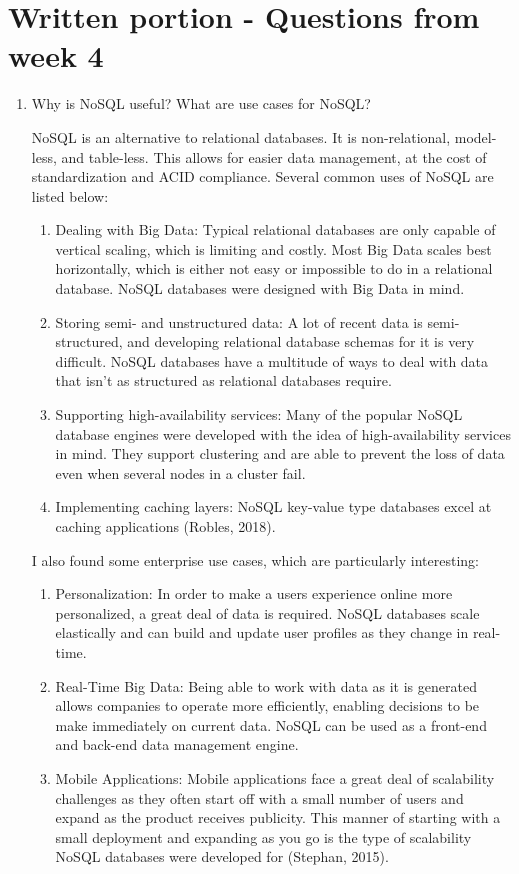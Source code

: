 \documentclass[]{article}
\begin{document}
\section{Written portion - Questions from week 4}
\begin{enumerate}
	
	\item Why is NoSQL useful? What are use cases for NoSQL?
	
	NoSQL is an alternative to relational databases.  It is non-relational, model-less, and table-less.  This allows for easier data management, at the cost of standardization and ACID compliance.  Several common uses of NoSQL are listed below:
	
	\begin{enumerate}
		\item Dealing with Big Data: Typical relational databases are only capable of vertical scaling, which is limiting and costly.  Most Big Data scales best horizontally, which is either not easy or impossible to do in a relational database.  NoSQL databases were designed with Big Data in mind.
		\item Storing semi- and unstructured data: A lot of recent data is semi-structured, and developing relational database schemas for it is very difficult.  NoSQL databases have a multitude of ways to deal with data that isn't as structured as relational databases require.
		\item Supporting high-availability services: Many of the popular NoSQL database engines were developed with the idea of high-availability services in mind.  They support clustering and are able to prevent the loss of data even when several nodes in a cluster fail.
		\item Implementing caching layers:  NoSQL key-value type databases excel at caching applications (Robles, 2018).
	\end{enumerate}
		I also found some enterprise use cases, which are particularly interesting:
	\begin{enumerate}
		\item Personalization:  In order to make a users experience online more personalized, a great deal of data is required.  NoSQL databases scale elastically and can build and update user profiles as they change in real-time.
		\item Real-Time Big Data: Being able to work with data as it is generated allows companies to operate more efficiently, enabling decisions to be make immediately on current data.  NoSQL can be used as a front-end and back-end data management engine.
		\item Mobile Applications: Mobile applications face a great deal of scalability challenges as they often start off with a small number of users and expand as the product receives publicity.  This manner of starting with a small deployment and expanding as you go is the type of scalability NoSQL databases were developed for (Stephan, 2015).
	\end{enumerate}


\end{enumerate}
\end{document}
